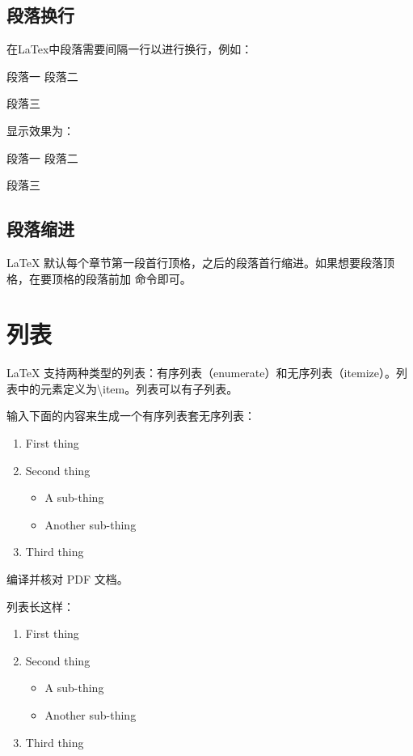 \subsection{段落换行}
在LaTex中段落需要间隔一行以进行换行，例如：

\begin{python}
段落一
段落二

段落三
\end{python}

显示效果为：

段落一
段落二

段落三

\subsection{段落缩进}

LaTeX 默认每个章节第一段首行顶格，之后的段落首行缩进。如果想要段落顶格，在要顶格的段落前加 \noindent 命令即可。

\section{列表}

LaTeX 支持两种类型的列表：有序列表（enumerate）和无序列表（itemize）。列表中的元素定义为\textbackslash item。列表可以有子列表。

\rightarrow 输入下面的内容来生成一个有序列表套无序列表：

\begin{python}
\begin{enumerate}
	\item First thing

	\item Second thing
	\begin{itemize}
		\item A sub-thing

		\item Another sub-thing
	\end{itemize}

	\item Third thing
\end{enumerate}
\end{python}

\rightarrow 编译并核对 PDF 文档。

列表长这样：

\begin{enumerate}
	\item First thing

	\item Second thing
	\begin{itemize}
		\item A sub-thing

		\item Another sub-thing
	\end{itemize}

	\item Third thing
\end{enumerate}

